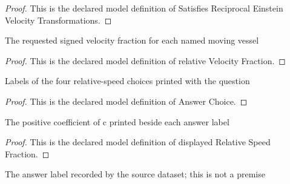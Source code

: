 \begin{proof}
  This is the declared model definition of Satisfies Reciprocal Einstein Velocity Transformations.
\end{proof}
\begin{definition}
  \label{def:physics:phyx-mini-0624:phyxminiproblems-problemphyxmini0624-relativevelocityfraction}
  The requested signed velocity fraction for each named moving vessel
\end{definition}
\begin{proof}
  This is the declared model definition of relative Velocity Fraction.
\end{proof}
\begin{definition}
  \label{def:physics:phyx-mini-0624:phyxminiproblems-problemphyxmini0624-answerchoice}
  Labels of the four relative-speed choices printed with the question
\end{definition}
\begin{proof}
  This is the declared model definition of Answer Choice.
\end{proof}
\begin{definition}
  \label{def:physics:phyx-mini-0624:phyxminiproblems-problemphyxmini0624-displayedrelativespeedfraction}
  The positive coefficient of c printed beside each answer label
\end{definition}
\begin{proof}
  This is the declared model definition of displayed Relative Speed Fraction.
\end{proof}
\begin{definition}
  \label{def:physics:phyx-mini-0624:phyxminiproblems-problemphyxmini0624-recordeddatasetanswer}
  The answer label recorded by the source dataset; this is not a premise
\end{definition}
